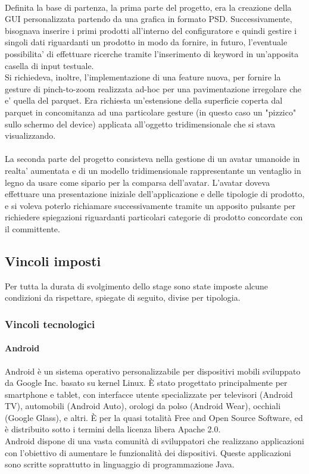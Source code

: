 \\
Definita la base di partenza, la prima parte del progetto, era la creazione della GUI personalizzata partendo da una grafica in formato PSD. Successivamente, bisognava inserire i primi prodotti all'interno del configuratore e quindi gestire i singoli dati riguardanti un prodotto in modo da fornire, in futuro, l'eventuale possibilita' di effettuare ricerche tramite l'inserimento di keyword in un'apposita casella di input testuale.
\\
Si richiedeva, inoltre, l'implementazione di una feature nuova, per fornire la gesture di pinch-to-zoom realizzata ad-hoc per una pavimentazione irregolare che e' quella del parquet. Era richiesta un'estensione della superficie coperta dal parquet in concomitanza ad una particolare gesture (in questo caso un "pizzico" sullo schermo del device) applicata all'oggetto tridimensionale che si stava visualizzando.
\\
\\
La seconda parte del progetto consisteva nella gestione di un avatar umanoide in realta' aumentata e di un modello tridimensionale rappresentante un ventaglio in legno da usare come sipario per la comparsa dell'avatar. L'avatar doveva effettuare una presentazione iniziale dell'applicazione e delle tipologie di prodotto, e si voleva poterlo richiamare successivamente tramite un apposito pulsante per richiedere spiegazioni riguardanti particolari categorie di prodotto concordate con il committente.

\subsection{Vincoli imposti}
Per tutta la durata di svolgimento dello stage sono state imposte alcune condizioni da rispettare, spiegate di seguito, divise per tipologia.

\subsubsection{Vincoli tecnologici}
\paragraph{Android}
Android è un sistema operativo personalizzabile per dispositivi mobili sviluppato da Google Inc. basato su kernel Linux.
È stato progettato principalmente per smartphone e tablet, con interfacce utente specializzate per televisori (Android TV), automobili (Android Auto), orologi da polso (Android Wear), occhiali (Google Glass), e altri.
È per la quasi totalità Free and Open Source Software, ed è distribuito sotto i termini della licenza libera Apache 2.0.\\
Android dispone di una vasta comunità di sviluppatori che realizzano applicazioni con l'obiettivo di aumentare le funzionalità dei dispositivi. Queste applicazioni sono scritte soprattutto in linguaggio di programmazione Java.
\\

